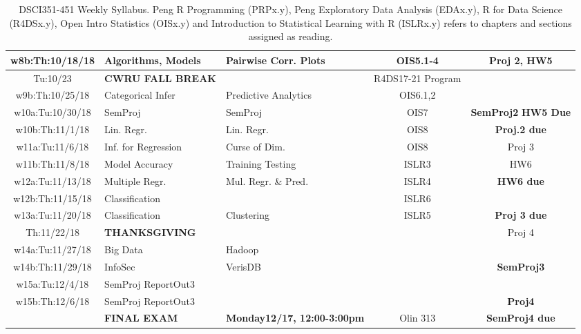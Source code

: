 \documentclass[11pt]{article} %
\begin{document}
\begin{table}[h]
\begin{tabular}{| c | p{3.4cm} | p{3.4cm} | c | c |}
	\hline
	w8b:Th:10/18/18 & Algorithms, Models & Pairwise Corr. Plots  & OIS5.1-4 & Proj 2, HW5 \\
	\hline
	\hline 
	Tu:10/23 & {\bf CWRU FALL BREAK} &  & R4DS17-21 Program \\ 
	\hline
	w9b:Th:10/25/18 & Categorical Infer  & Predictive Analytics & OIS6.1,2 & \\ 
	\hline 
	\hline
	w10a:Tu:10/30/18 & SemProj & SemProj & OIS7   &  {\bf SemProj2}  {\bf HW5 Due}  \\
	\hline
	w10b:Th:11/1/18 & Lin. Regr. & Lin. Regr. &  OIS8 &  {\bf Proj.2 due} \\	
	\hline
	\hline
	w11a:Tu:11/6/18 & Inf. for Regression  & Curse of Dim. & OIS8 & Proj 3  \\
	\hline 
	w11b:Th:11/8/18 & Model Accuracy & Training Testing & ISLR3 & HW6  \\ 
	\hline
	\hline
	w12a:Tu:11/13/18 & Multiple Regr. & Mul. Regr. \& Pred. & ISLR4 & {\bf HW6 due}  \\
	\hline 
	w12b:Th:11/15/18 & Classification &  & ISLR6  &   \\ 
	\hline
	\hline
	w13a:Tu:11/20/18 & Classification & Clustering & ISLR5 & {\bf } {\bf Proj 3 due} \\
	\hline 
	Th:11/22/18 & {\bf THANKSGIVING} &  &   &  Proj 4 \\ 
	\hline
	\hline 
	w14a:Tu:11/27/18 & Big Data & Hadoop & &  \\ 
	\hline
	w14b:Th:11/29/18 & InfoSec & VerisDB &  & {\bf SemProj3} \\
	\hline
	w15a:Tu:12/4/18 & SemProj ReportOut3  &  & {\bf } \\ 
	\hline
	w15b:Th:12/6/18 & SemProj ReportOut3 &  & & {\bf Proj4} \\
	\hline
	\hline
	\hline
		  & {\bf FINAL EXAM} & {\bf Monday12/17, 12:00-3:00pm}  & Olin 313 & {\bf SemProj4 due} \\
	\hline
	\hline
\end{tabular}
 
\caption{DSCI351-451 Weekly Syllabus. Peng R Programming (PRPx.y), Peng Exploratory Data Analysis (EDAx.y), R for Data Science (R4DSx.y), Open Intro Statistics (OISx.y) and Introduction to Statistical Learning with R (ISLRx.y) refers to chapters and sections assigned as reading. }
\label{table:Syllabus} %
\end{table} 

\FloatBarrier

\end{document}
